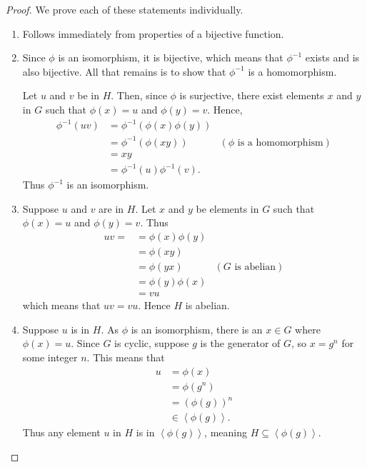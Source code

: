 \begin{proof}
    We prove each of these statements individually.
    \begin{enumerate}
        \item Follows immediately from properties of a bijective function.

        \item Since $\phi$ is an isomorphism, it is bijective, which means that $\phi^{-1}$ exists and is also bijective. All that remains is to show that $\phi^{-1}$ is a homomorphism.

        Let $u$ and $v$ be in $H$. Then, since $\phi$ is surjective, there exist elements $x$ and $y$ in $G$ such that $\phi(x) = u$ and $\phi(y) = v$. Hence,
        \begin{align*}
            \phi^{-1}(uv) &= \phi^{-1}\left(\phi(x)\phi(y)\right)\\
            &= \phi^{-1}\left(\phi(xy)\right) & (\phi \text{ is a homomorphism})\\
            &= xy\\
            &= \phi^{-1}(u) \phi^{-1}(v).
        \end{align*}
        Thus $\phi^{-1}$ is an isomorphism.

        \item Suppose $u$ and $v$ are in $H$. Let $x$ and $y$ be elements in $G$ such that $\phi(x) = u$ and $\phi(y) = v$. Thus
        \begin{align*}
            uv = &= \phi(x)\phi(y) \\
            &= \phi(xy)\\
            &= \phi(yx) & (G \text{ is abelian})\\
            &= \phi(y)\phi(x)\\
            &= vu
        \end{align*}
        which means that $uv = vu$. Hence $H$ is abelian.

        \item Suppose $u$ is in $H$. As $\phi$ is an isomorphism, there is an $x \in G$ where $\phi(x) = u$. Since $G$ is cyclic, suppose $g$ is the generator of $G$, so $x = g^n$ for some integer $n$. This means that
        \begin{align*}
            u &= \phi(x)\\
            &= \phi(g^n)\\
            &= \left(\phi(g)\right)^n\\
            &\in \left\langle \phi(g) \right\rangle.
        \end{align*}
        Thus any element $u$ in $H$ is in $\left\langle \phi(g) \right\rangle$, meaning $H \subseteq \left\langle \phi(g) \right\rangle$.


\end{enumerate}
\end{proof}
